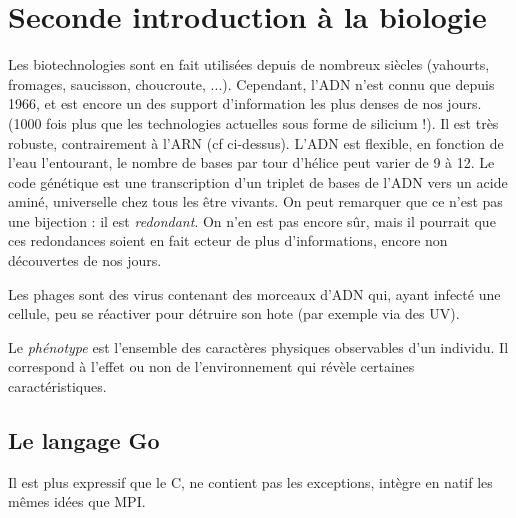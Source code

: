 \documentclass{article}
\begin{document}
\section{Seconde introduction à la biologie}
Les biotechnologies sont en fait utilisées depuis de nombreux siècles (yahourts, fromages, saucisson, choucroute, ...). Cependant, l'ADN n'est connu que depuis 1966, et est encore un des support d'information les plus denses de nos jours. (1000 fois plus que les technologies actuelles sous forme de silicium !). Il est très robuste, contrairement à l'ARN (cf ci-dessus). L'ADN est flexible, en fonction de l'eau l'entourant, le nombre de bases par tour d'hélice peut varier de 9 à 12. Le code génétique est une transcription d'un triplet de bases de l'ADN vers un acide aminé, universelle chez tous les être vivants. On peut remarquer que ce n'est pas une bijection : il est \emph{redondant}. On n'en est pas encore sûr, mais il pourrait que ces redondances soient en fait ecteur de plus d'informations, encore non découvertes de nos jours.


Les phages sont des virus contenant des morceaux d'ADN qui, ayant infecté une cellule, peu se réactiver pour détruire son hote (par exemple via des UV).


Le \emph{phénotype} est l'ensemble des caractères physiques observables d'un individu. Il correspond à l'effet ou non de l'environnement qui révèle certaines caractéristiques.

\subsection*{Le langage Go}
Il est plus expressif que le C, ne contient pas les exceptions, intègre en natif les mêmes idées que MPI.
\end{document}
